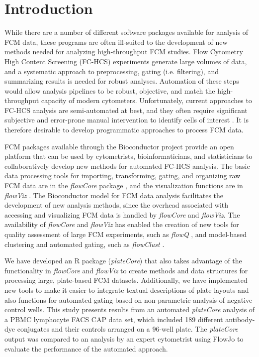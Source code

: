 \documentclass[12pt]{article}
\newcommand{\Rpackage}[1]{{\textit{#1}}}
\begin{document}
\section*{Introduction}

While there are a number of different software packages available for analysis
of FCM data, these programs are often ill-suited to the development of new
methods needed for analyzing high-throughput FCM studies. Flow Cytometry High
Content Screening (FC-HCS) experiments generate large volumes of data, and a
systematic approach to preprocessing, gating (i.e. filtering), and summarizing
results is needed for robust analyses. Automation of these steps would allow
analysis pipelines to be robust, objective, and match the high-throughput
capacity of modern cytometers. Unfortunately, current approaches to FC-HCS
analysis are semi-automated at best, and they often require significant
subjective and error-prone manual intervention to identify cells of interest
\citep{Maecker2005}. It is therefore desirable to develop programmatic
approaches to process FCM data.

FCM packages available through the Bioconductor \citep{BIOC} project provide an
open platform that can be used by cytometrists, bioinformaticians, and
statisticians to collaboratively develop new methods for automated FC-HCS
analysis. The basic data processing tools for importing, transforming, gating,
and organizing raw FCM data are in the \Rpackage{flowCore} package
\citep{hahne2009}, and the visualization functions are in \Rpackage{flowViz}
\citep{sarkar2008ufv}. The Bioconductor model for FCM data analysis facilitates
the development of new analysis methods, since the overhead associated with
accessing and visualizing FCM data is handled by \Rpackage{flowCore} and
\Rpackage{flowViz}. The availability of \Rpackage{flowCore} and
\Rpackage{flowViz} has enabled the creation of new tools for quality assessment
of large FCM experiments, such as \Rpackage{flowQ} \citep{lemeurFQ}, and
model-based clustering and automated gating, such as \Rpackage{flowClust}
\citep{lo2008}.

We have developed an R package (\Rpackage{plateCore}) that also takes advantage
of the functionality in \Rpackage{flowCore} and \Rpackage{flowViz} to create
methods and data structures for processing large, plate-based FCM datasets.
Additionally, we have implemented new tools to make it easier to integrate
textual descriptions of plate layouts and also functions for automated gating
based on non-parametric analysis of negative control wells. This study presents
results from an automated \Rpackage{plateCore} analysis of a PBMC lymphocyte
FACS CAP data set, which included 189 different antibody-dye conjugates
and their controls arranged on a 96-well plate. The \Rpackage{plateCore} output
was compared to an analysis by an expert cytometrist using FlowJo to evaluate
the performance of the automated approach.
\end{document}
